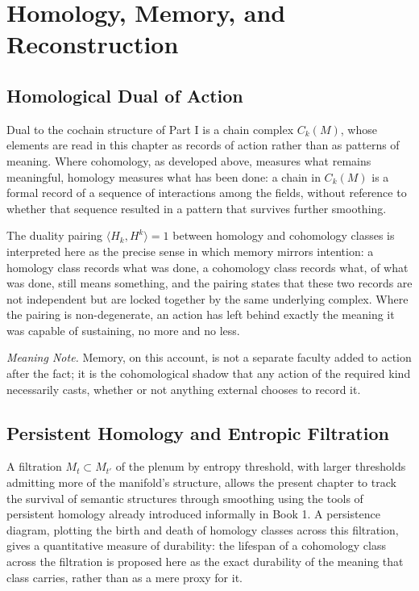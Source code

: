 \part{Homology, Memory, and Reconstruction}

\chapter{Homological Dual of Action}

Dual to the cochain structure of Part I is a chain complex $C_k(M)$, whose elements are read in this chapter as records of action rather than as patterns of meaning. Where cohomology, as developed above, measures what remains meaningful, homology measures what has been done: a chain in $C_k(M)$ is a formal record of a sequence of interactions among the fields, without reference to whether that sequence resulted in a pattern that survives further smoothing.

The duality pairing $\langle H_k, H^k \rangle = 1$ between homology and cohomology classes is interpreted here as the precise sense in which memory mirrors intention: a homology class records what was done, a cohomology class records what, of what was done, still means something, and the pairing states that these two records are not independent but are locked together by the same underlying complex. Where the pairing is non-degenerate, an action has left behind exactly the meaning it was capable of sustaining, no more and no less.

\emph{Meaning Note.} Memory, on this account, is not a separate faculty added to action after the fact; it is the cohomological shadow that any action of the required kind necessarily casts, whether or not anything external chooses to record it.

\chapter{Persistent Homology and Entropic Filtration}

A filtration $M_t \subset M_{t'}$ of the plenum by entropy threshold, with larger thresholds admitting more of the manifold's structure, allows the present chapter to track the survival of semantic structures through smoothing using the tools of persistent homology already introduced informally in Book 1. A persistence diagram, plotting the birth and death of homology classes across this filtration, gives a quantitative measure of durability: the lifespan of a cohomology class across the filtration is proposed here as the exact durability of the meaning that class carries, rather than as a mere proxy for it.

